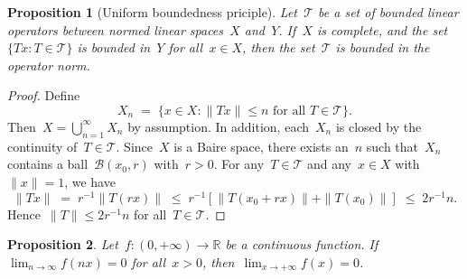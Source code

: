 \documentclass[11pt,a4paper]{article}  %
\newtheorem{proposition}{Proposition}[section]
\theoremstyle{definition}
\def\real{\mathbb{R}}
\newcommand{\TT}{\mathcal{T}}
\newcommand{\BB}{\mathcal{B}}
\numberwithin{equation}{section}
\begin{document}
\begin{proposition}[Uniform boundedness priciple]
    \label{prop:ub}
    Let~$\TT$ be a set of bounded linear operators between normed linear spaces~$X$ and~$Y$.
    If~$X$ is complete, and the set~$\{Tx \mathrel{:} T\in \TT\}$ is bounded in~$Y$ for all~$x\in X$,
    then the set~$\TT$ is bounded in the operator norm.
\end{proposition}

\begin{proof}
    Define
    \[
        X_n \;=\; \{x\in X \mathrel{:}  \|Tx\| \le n \text{ for all } T \in \TT\}.
    \]
    Then~$X = \bigcup_{n=1}^\infty X_n$ by assumption.  In addition, each~$X_n$ is closed by the
    continuity of~$T \in \TT$. Since~$X$ is a Baire space, there exists an~$n$ such that~$X_n$
    contains a ball~$\BB(x_0, r)$ with~$r>0$. For any~$T\in\TT$ and any~$x \in X$ with~$\|x\| = 1$, we have
    \[
        \|Tx\| \;=\; r^{-1}\|T(rx)\| \;\le\; r^{-1}\left[\|T(x_0 + rx)\| + \|T(x_0)\|\right] \;\le\; 2r^{-1} n.
    \]
    Hence~$\|T\|\le 2r^{-1}n$ for all~$T\in\TT$.
\end{proof}

\begin{proposition}
    \label{prop:nx}
  Let~$f\mathrel{:} (0,+\infty)\to \real$ be a continuous function. If~$\lim_{n\to \infty}f(nx) = 0$
   for all~$x>0$, then~$\lim_{x\to +\infty} f(x) = 0$.
\end{proposition}
\end{document}
